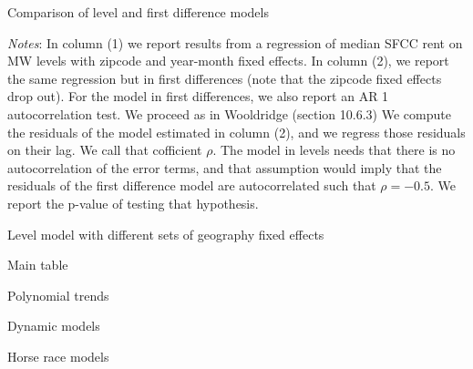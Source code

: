 \documentclass{article}
\begin{document}
\begin{table}[h!] \centering
   \caption{Comparison of level and first difference models}
	\resizebox{0.9\textwidth}{!}{
   
   }
   \begin{minipage}{0.9\textwidth} \footnotesize
		\vspace{3mm} 
		\textit{Notes}: In column (1) we report results from a regression of median SFCC rent on MW levels with zipcode and year-month fixed effects. In column (2), we report the same regression but in first differences (note that the zipcode  fixed effects drop out). For the model in first differences, we also report an AR 1 autocorrelation test. We proceed as in Wooldridge (section 10.6.3) We compute the residuals of the model estimated in column (2), and we regress those residuals on their lag. We call that cofficient $\rho$. The model in levels needs that there is no autocorrelation of the error terms, and that assumption would imply that the residuals of the first difference model are autocorrelated such that $\rho = -0.5$. We report the p-value of testing that hypothesis.
    \end{minipage} 
\end{table}

\begin{table}[h!] \centering
   \caption{Level model with different sets of geography fixed effects}
	\resizebox{0.9\textwidth}{!}{
   
   }
\end{table}



\begin{table}[h!] \centering
   \caption{Main table}
   
\end{table}

\begin{table}[h!] \centering
	\caption{Polynomial trends}
	
\end{table}

\clearpage
\begin{table}[h!]\centering
	\caption{Dynamic models}
	
\end{table}

\clearpage
\begin{table}[h!]\centering
	\caption{Horse race models}
	\resizebox{\textwidth}{!}{
		
	}
\end{table}
\end{document}
